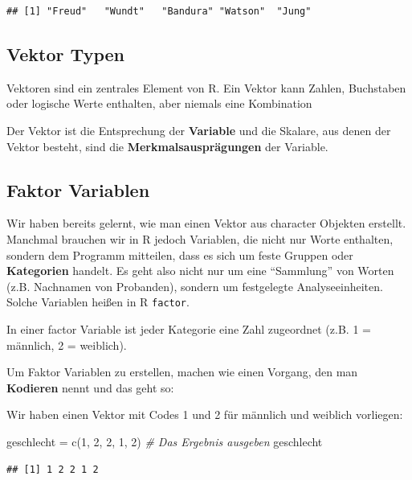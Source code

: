 \documentclass[
]{book}
\newenvironment{Shaded}{\begin{snugshade}}{\end{snugshade}}
\newcommand{\CommentTok}[1]{\textcolor[rgb]{0.56,0.35,0.01}{\textit{#1}}}
\newcommand{\DecValTok}[1]{\textcolor[rgb]{0.00,0.00,0.81}{#1}}
\newcommand{\FunctionTok}[1]{\textcolor[rgb]{0.00,0.00,0.00}{#1}}
\newcommand{\NormalTok}[1]{#1}
\newcommand{\OtherTok}[1]{\textcolor[rgb]{0.56,0.35,0.01}{#1}}
\begin{document}
\begin{verbatim}
## [1] "Freud"   "Wundt"   "Bandura" "Watson"  "Jung"
\end{verbatim}

\hypertarget{vektor-typen}{%
\subsection{Vektor Typen}\label{vektor-typen}}

Vektoren sind ein zentrales Element von R. Ein Vektor kann Zahlen, Buchstaben oder logische Werte enthalten, aber niemals eine Kombination

Der Vektor ist die Entsprechung der \textbf{Variable} und die Skalare, aus denen der Vektor besteht, sind die \textbf{Merkmalsausprägungen} der Variable.

\hypertarget{faktor-variablen}{%
\subsection{Faktor Variablen}\label{faktor-variablen}}

Wir haben bereits gelernt, wie man einen Vektor aus character Objekten erstellt. Manchmal brauchen wir in R jedoch Variablen, die nicht nur Worte enthalten, sondern dem Programm mitteilen, dass es sich um feste Gruppen oder \textbf{Kategorien} handelt. Es geht also nicht nur um eine ``Sammlung'' von Worten (z.B. Nachnamen von Probanden), sondern um festgelegte Analyseeinheiten. Solche Variablen heißen in R \texttt{factor}.

In einer factor Variable ist jeder Kategorie eine Zahl zugeordnet (z.B. 1 = männlich, 2 = weiblich).

Um Faktor Variablen zu erstellen, machen wie einen Vorgang, den man \textbf{Kodieren} nennt und das geht so:

Wir haben einen Vektor mit Codes 1 und 2 für männlich und weiblich vorliegen:

\begin{Shaded}
\begin{Highlighting}[]
\NormalTok{geschlecht }\OtherTok{=} \FunctionTok{c}\NormalTok{(}\DecValTok{1}\NormalTok{, }\DecValTok{2}\NormalTok{, }\DecValTok{2}\NormalTok{, }\DecValTok{1}\NormalTok{, }\DecValTok{2}\NormalTok{)}
\CommentTok{\# Das Ergebnis ausgeben}
\NormalTok{geschlecht}
\end{Highlighting}
\end{Shaded}

\begin{verbatim}
## [1] 1 2 2 1 2
\end{verbatim}
\end{document}
